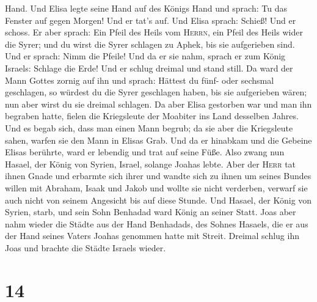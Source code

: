 Hand. Und Elisa legte seine Hand auf des Königs Hand  und
sprach: Tu das Fenster auf gegen Morgen! Und er tat's auf. Und Elisa
sprach: Schieß! Und er schoss. Er aber sprach: Ein Pfeil des Heils vom
\textsc{Herrn}, ein Pfeil des Heils wider die Syrer; und du wirst die
Syrer schlagen zu Aphek, bis sie aufgerieben sind.  Und
er sprach: Nimm die Pfeile! Und da er sie nahm, sprach er zum König
Israels: Schlage die Erde! Und er schlug dreimal und stand still.
 Da ward der Mann Gottes zornig auf ihn und sprach:
Hättest du fünf- oder sechsmal geschlagen, so würdest du die Syrer
geschlagen haben, bis sie aufgerieben wären; nun aber wirst du sie
dreimal schlagen.  Da aber Elisa gestorben war und man
ihn begraben hatte, fielen die Kriegsleute der Moabiter ins Land
desselben Jahres.  Und es begab sich, dass man einen Mann
begrub; da sie aber die Kriegsleute sahen, warfen sie den Mann in Elisas
Grab. Und da er hinabkam und die Gebeine Elisas berührte, ward er
lebendig und trat auf seine Füße.  Also zwang nun Hasael,
der König von Syrien, Israel, solange Joahas lebte.  Aber
der \textsc{Herr} tat ihnen Gnade und erbarmte sich ihrer und wandte
sich zu ihnen um seines Bundes willen mit Abraham, Isaak und Jakob und
wollte sie nicht verderben, verwarf sie auch nicht von seinem Angesicht
bis auf diese Stunde.  Und Hasael, der König von Syrien,
starb, und sein Sohn Benhadad ward König an seiner Statt.
 Joas aber nahm wieder die Städte aus der Hand Benhadads,
des Sohnes Hasaels, die er aus der Hand seines Vaters Joahas genommen
hatte mit Streit. Dreimal schlug ihn Joas und brachte die Städte Israels
wieder.

\hypertarget{section-13}{%
\section{14}\label{section-13}}

